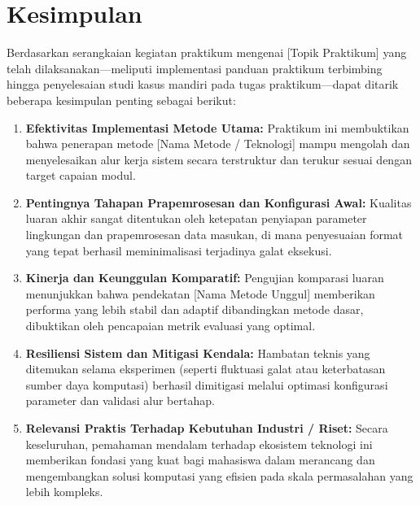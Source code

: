 
\chapter{Kesimpulan}
\label{chap:kesimpulan}

Berdasarkan serangkaian kegiatan praktikum mengenai [Topik Praktikum] yang telah dilaksanakan—meliputi implementasi panduan praktikum terbimbing hingga penyelesaian studi kasus mandiri pada tugas praktikum—dapat ditarik beberapa kesimpulan penting sebagai berikut:

\begin{enumerate}
    \item \textbf{Efektivitas Implementasi Metode Utama:} Praktikum ini membuktikan bahwa penerapan metode [Nama Metode / Teknologi] mampu mengolah dan menyelesaikan alur kerja sistem secara terstruktur dan terukur sesuai dengan target capaian modul.
    
    \item \textbf{Pentingnya Tahapan Prapemrosesan dan Konfigurasi Awal:} Kualitas luaran akhir sangat ditentukan oleh ketepatan penyiapan parameter lingkungan dan prapemrosesan data masukan, di mana penyesuaian format yang tepat berhasil meminimalisasi terjadinya galat eksekusi.
    
    \item \textbf{Kinerja dan Keunggulan Komparatif:} Pengujian komparasi luaran menunjukkan bahwa pendekatan [Nama Metode Unggul] memberikan performa yang lebih stabil dan adaptif dibandingkan metode dasar, dibuktikan oleh pencapaian metrik evaluasi yang optimal.
    
    \item \textbf{Resiliensi Sistem dan Mitigasi Kendala:} Hambatan teknis yang ditemukan selama eksperimen (seperti fluktuasi galat atau keterbatasan sumber daya komputasi) berhasil dimitigasi melalui optimasi konfigurasi parameter dan validasi alur bertahap.
    
    \item \textbf{Relevansi Praktis Terhadap Kebutuhan Industri / Riset:} Secara keseluruhan, pemahaman mendalam terhadap ekosistem teknologi ini memberikan fondasi yang kuat bagi mahasiswa dalam merancang dan mengembangkan solusi komputasi yang efisien pada skala permasalahan yang lebih kompleks.
\end{enumerate}
